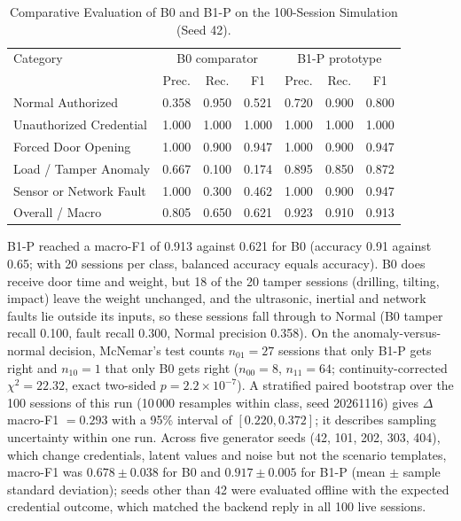 \documentclass[journal,onecolumn]{IEEEtran}
\begin{document}
\begin{table}[!htbp]
\renewcommand{\arraystretch}{1.02}
\centering
\small
\caption{Comparative Evaluation of B0 and B1-P on the 100-Session Simulation (Seed 42).}
\label{tab:b0_vs_b1}
\vspace{2pt}
\begin{tabular}{l ccc ccc}
\hline
Category & \multicolumn{3}{c}{B0 comparator} & \multicolumn{3}{c}{B1-P prototype} \\
 & Prec. & Rec. & F1 & Prec. & Rec. & F1 \\
\hline
\rule{0pt}{2.6ex}Normal Authorized & 0.358 & 0.950 & 0.521 & 0.720 & 0.900 & 0.800 \\
Unauthorized Credential & 1.000 & 1.000 & 1.000 & 1.000 & 1.000 & 1.000 \\
Forced Door Opening & 1.000 & 0.900 & 0.947 & 1.000 & 0.900 & 0.947 \\
Load / Tamper Anomaly & 0.667 & 0.100 & 0.174 & 0.895 & 0.850 & 0.872 \\
Sensor or Network Fault & 1.000 & 0.300 & 0.462 & 1.000 & 0.900 & 0.947 \\
\hline
\rule{0pt}{2.6ex}Overall / Macro & 0.805 & 0.650 & 0.621 & 0.923 & 0.910 & 0.913 \\
\hline
\end{tabular}
\end{table}

B1-P reached a macro-F1 of 0.913 against 0.621 for B0 (accuracy 0.91 against 0.65; with 20 sessions per class,
balanced accuracy equals accuracy). B0 does receive door time and weight, but 18 of the 20 tamper sessions (drilling,
tilting, impact) leave the weight unchanged, and the ultrasonic, inertial and network faults lie outside its inputs,
so these sessions fall through to Normal (B0 tamper recall 0.100, fault recall 0.300, Normal precision 0.358). On the
anomaly-versus-normal decision, McNemar's test counts $n_{01}=27$ sessions that only B1-P gets right and $n_{10}=1$
that only B0 gets right ($n_{00}=8$, $n_{11}=64$; continuity-corrected $\chi^2=22.32$, exact two-sided $p=2.2\times
10^{-7}$). A stratified paired bootstrap over the 100 sessions of this run (10\,000 resamples within class, seed
20261116) gives $\Delta$macro-F1 $=0.293$ with a 95\% interval of $[0.220, 0.372]$; it describes sampling uncertainty
within one run. Across five generator seeds (42, 101, 202, 303, 404), which change credentials, latent values and
noise but not the scenario templates, macro-F1 was $0.678\pm0.038$ for B0 and $0.917\pm0.005$ for B1-P (mean $\pm$
sample standard deviation); seeds other than 42 were evaluated offline with the expected credential outcome, which
matched the backend reply in all 100 live sessions.
\end{document}

